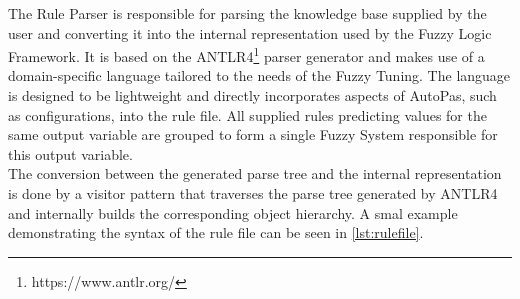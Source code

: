The Rule Parser is responsible for parsing the knowledge base supplied by the user and converting it into the internal representation used by the Fuzzy Logic Framework. It is based on the ANTLR4\footnote{https://www.antlr.org/} parser generator and makes use of a domain-specific language tailored to the needs of the Fuzzy Tuning. The language is designed to be lightweight and directly incorporates aspects of AutoPas, such as configurations, into the rule file. All supplied rules predicting values for the same output variable are grouped to form a single Fuzzy System responsible for this output variable. \\
The conversion between the generated parse tree and the internal representation is done by a visitor pattern that traverses the parse tree generated by ANTLR4 and internally builds the corresponding object hierarchy.
A smal example demonstrating the syntax of the rule file can be seen in \autoref{lst:rulefile}.

\smallskip

